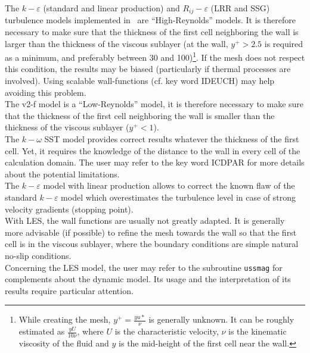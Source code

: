 The $k-\varepsilon$ (standard and linear production) and $R_{ij}-\varepsilon$
(LRR and SSG) turbulence
models implemented in \CS\ are ``High-Reynolds'' models. It is therefore
necessary to make sure that the thickness of the first cell neighboring
the wall is larger than the thickness of the viscous sublayer (at the
wall, $y^+>2.5$ is required as a minimum, and preferably between 30 and
100)\footnote{While creating the mesh, $y^+=\frac{yu*}{\nu}$ is
generally unknown. It can be roughly estimated as $\frac{yU}{10\nu}$, where
$U$ is the characteristic velocity, $\nu$ is the kinematic viscosity of the fluid
 and $y$ is the mid-height of the first cell near the wall.}. If the mesh does
 not respect this condition, the results may be biased
(particularly if thermal processes are involved). Using scalable wall-functions
(cf. key word IDEUCH) may help avoiding this problem.\\
The v2-f model is a ``Low-Reynolds'' model, it is therefore necessary to
make sure that the thickness of the first cell neighboring the wall is
smaller than the thickness of the viscous sublayer ($y^+<1$).\\
The $k-\omega$ SST model provides correct results whatever the thickness of the first cell.
Yet, it requires the knowledge of the distance to the wall in every
cell of the calculation domain. The user may refer to the key word
ICDPAR for more details about the potential limitations.\\
The $k-\varepsilon$ model with linear production allows to correct the
known flaw of the standard $k-\varepsilon$ model which overestimates the
turbulence level in case of strong velocity gradients (stopping point).\\
With LES, the wall functions are usually not greatly adapted. It is generally more advisable
(if possible) to refine the mesh towards the wall so that the first cell is in the
viscous sublayer, where the boundary conditions are simple natural no-slip conditions.\\
Concerning the LES model, the user may refer to the subroutine
\texttt{ussmag} for complements about the dynamic model. Its usage
and the interpretation of its results require particular attention.\\

